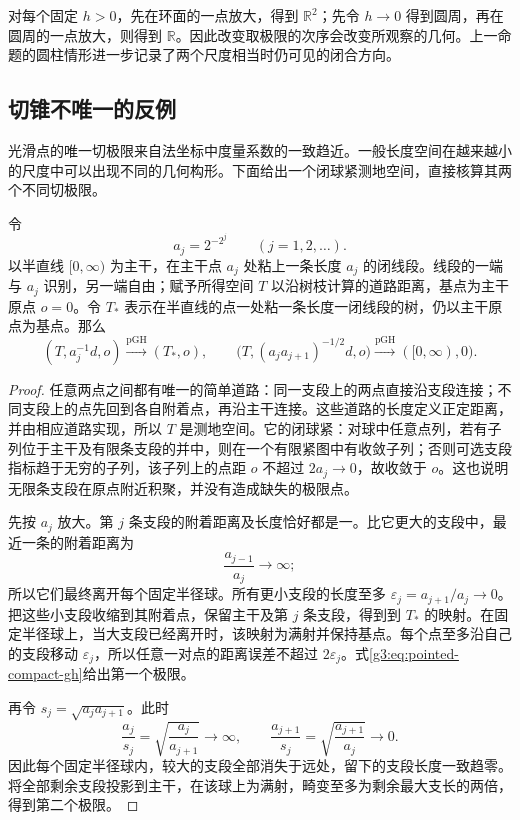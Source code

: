 对每个固定 \(h>0\)，先在环面的一点放大，得到 \(\mathbb R^2\)；先令 \(h\to0\) 得到圆周，再在圆周的一点放大，则得到 \(\mathbb R\)。因此改变取极限的次序会改变所观察的几何。上一命题的圆柱情形进一步记录了两个尺度相当时仍可见的闭合方向。

\subsection{切锥不唯一的反例}
\label{g3:subsec:1004:04}
光滑点的唯一切极限来自法坐标中度量系数的一致趋近。一般长度空间在越来越小的尺度中可以出现不同的几何构形。下面给出一个闭球紧测地空间，直接核算其两个不同切极限。

\begin{example}\label{g3:exm:nonunique-tangent-tree}
	令
	\[
		a_j=2^{-2^j}\qquad(j=1,2,\ldots).
	\]
	以半直线 \([0,\infty)\) 为主干，在主干点 \(a_j\) 处粘上一条长度 \(a_j\) 的闭线段。线段的一端与 \(a_j\) 识别，另一端自由；赋予所得空间 \(T\) 以沿树枝计算的道路距离，基点为主干原点 \(o=0\)。令 \(T_*\) 表示在半直线的点一处粘一条长度一闭线段的树，仍以主干原点为基点。那么
	\begin{equation}\label{g3:eq:nonunique-tree-tangents}
		(T,a_j^{-1}d,o)\xrightarrow{\mathrm{pGH}}(T_*,o),
		\qquad
		\bigl(T,(a_ja_{j+1})^{-1/2}d,o\bigr)
		\xrightarrow{\mathrm{pGH}}([0,\infty),0).
	\end{equation}
\end{example}
\begin{proof}
	任意两点之间都有唯一的简单道路：同一支段上的两点直接沿支段连接；不同支段上的点先回到各自附着点，再沿主干连接。这些道路的长度定义正定距离，并由相应道路实现，所以 \(T\) 是测地空间。它的闭球紧：对球中任意点列，若有子列位于主干及有限条支段的并中，则在一个有限紧图中有收敛子列；否则可选支段指标趋于无穷的子列，该子列上的点距 \(o\) 不超过 \(2a_j\to0\)，故收敛于 \(o\)。这也说明无限条支段在原点附近积聚，并没有造成缺失的极限点。

	先按 \(a_j\) 放大。第 \(j\) 条支段的附着距离及长度恰好都是一。比它更大的支段中，最近一条的附着距离为
	\[
		\frac{a_{j-1}}{a_j}\longrightarrow\infty;
	\]
	所以它们最终离开每个固定半径球。所有更小支段的长度至多
	\(\varepsilon_j=a_{j+1}/a_j\to0\)。把这些小支段收缩到其附着点，保留主干及第 \(j\) 条支段，得到到 \(T_*\) 的映射。在固定半径球上，当大支段已经离开时，该映射为满射并保持基点。每个点至多沿自己的支段移动 \(\varepsilon_j\)，所以任意一对点的距离误差不超过 \(2\varepsilon_j\)。式\eqref{g3:eq:pointed-compact-gh}给出第一个极限。

	再令 \(s_j=\sqrt{a_ja_{j+1}}\)。此时
	\[
		\frac{a_j}{s_j}=\sqrt{\frac{a_j}{a_{j+1}}}\longrightarrow\infty,
		\qquad
		\frac{a_{j+1}}{s_j}=\sqrt{\frac{a_{j+1}}{a_j}}\longrightarrow0.
	\]
	因此每个固定半径球内，较大的支段全部消失于远处，留下的支段长度一致趋零。将全部剩余支段投影到主干，在该球上为满射，畸变至多为剩余最大支长的两倍，得到第二个极限。
\end{proof}

